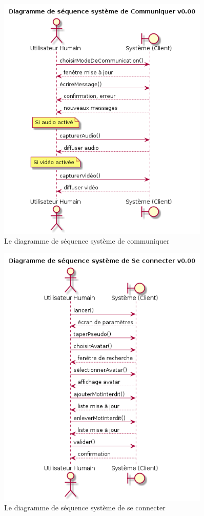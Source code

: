 \documentclass[11pt,dvipsnames,svgnames]{report}
\begin{document}
\begin{figure}[H]
\centerline{\includegraphics[width=0.9\textwidth]{diagrammes/dss-communiquer.png}}
\caption{Le diagramme de séquence système de \og communiquer \fg}
\end{figure}

\begin{figure}[H]
\centerline{\includegraphics[width=0.9\textwidth]{diagrammes/dss-connexion.png}}
\caption{Le diagramme de séquence système de \og se connecter \fg}
\end{figure}
\end{document}
